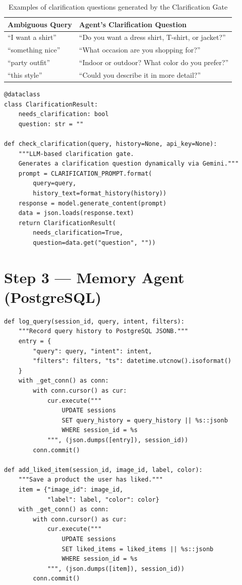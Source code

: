 \documentclass[12pt, twoside]{report}
\begin{document}
\begin{table}[H]
\centering
\begin{tabular}{ll}
\toprule
\textbf{Ambiguous Query} & \textbf{Agent's Clarification Question}\\
\midrule
``I want a shirt''        & ``Do you want a dress shirt, T-shirt, or jacket?''\\
``something nice''        & ``What occasion are you shopping for?''\\
``party outfit''          & ``Indoor or outdoor? What color do you prefer?''\\
``this style''            & ``Could you describe it in more detail?''\\
\bottomrule
\end{tabular}
\caption{Examples of clarification questions generated by the Clarification Gate}
\end{table}

\begin{lstlisting}[caption={Clarification Gate --- agent/clarification\_gate.py}]
@dataclass
class ClarificationResult:
    needs_clarification: bool
    question: str = ""

def check_clarification(query, history=None, api_key=None):
    """LLM-based clarification gate.
    Generates a clarification question dynamically via Gemini."""
    prompt = CLARIFICATION_PROMPT.format(
        query=query,
        history_text=format_history(history))
    response = model.generate_content(prompt)
    data = json.loads(response.text)
    return ClarificationResult(
        needs_clarification=True,
        question=data.get("question", ""))
\end{lstlisting}

\section{Step 3 --- Memory Agent (PostgreSQL)}

\begin{lstlisting}[caption={Memory Agent --- agent/memory.py}]
def log_query(session_id, query, intent, filters):
    """Record query history to PostgreSQL JSONB."""
    entry = {
        "query": query, "intent": intent,
        "filters": filters, "ts": datetime.utcnow().isoformat()
    }
    with _get_conn() as conn:
        with conn.cursor() as cur:
            cur.execute("""
                UPDATE sessions
                SET query_history = query_history || %s::jsonb
                WHERE session_id = %s
            """, (json.dumps([entry]), session_id))
        conn.commit()

def add_liked_item(session_id, image_id, label, color):
    """Save a product the user has liked."""
    item = {"image_id": image_id,
            "label": label, "color": color}
    with _get_conn() as conn:
        with conn.cursor() as cur:
            cur.execute("""
                UPDATE sessions
                SET liked_items = liked_items || %s::jsonb
                WHERE session_id = %s
            """, (json.dumps([item]), session_id))
        conn.commit()
\end{lstlisting}
\end{document}
